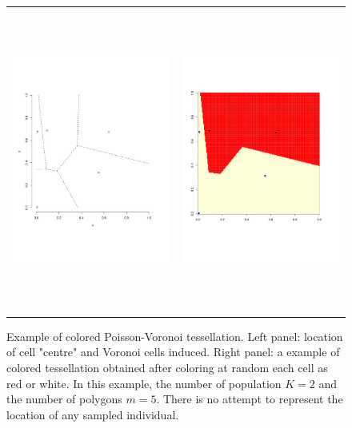 \documentclass[a4paper,10pt]{article}
\begin{document}
\begin{figure}[h]
\vspace{-1cm}
\begin{tabular}{cc}
\vspace{-1cm}
\includegraphics[height=10cm,width=7.5cm]{./fig/vor1.jpeg} & \includegraphics[height=10cm,width=7.5cm]{./fig/vor2.jpeg}
\end{tabular}
\caption{Example of colored Poisson-Voronoi tessellation. Left panel: location of cell "centre" and Voronoi cells induced. 
Right panel: a example of colored tessellation obtained after coloring at random each cell as red or white. 
In this example, the number of population $K=2$ and the number of polygons $m=5$.
There is no attempt to represent the location of any sampled individual.}\label{fig:vor}
\end{figure}
\end{document}
